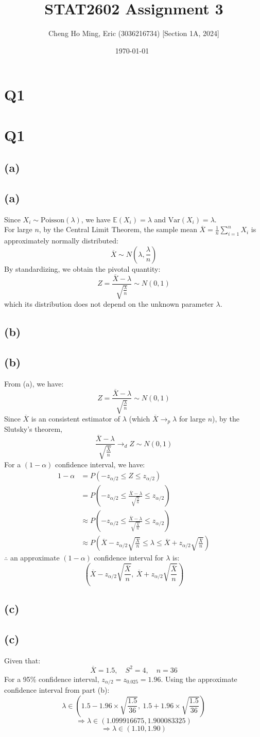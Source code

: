 \documentclass{article}
\title{STAT2602 Assignment 3}
\author{Cheng Ho Ming, Eric (3036216734) [Section 1A, 2024]}
\date{\today \ \currenttime}
\newcommand{\mysectionstar}[2][]{%
    \ifthenelse{\equal{#1}{}}%
        {\section*{#2}}%
        {\section*[#1]{#2}}%
    \outline{1}{#2}%
}
\newcommand{\mysubsectionstar}[2][]{%
    \ifthenelse{\equal{#1}{}}%
        {\subsection*{#2}}%
        {\subsection*[#1]{#2}}%
    \outline{2}{#2}%
}
\begin{document}
\maketitle

\mysectionstar{Q1}

\mysubsectionstar{(a)}

Since \( X_i \sim \text{Poisson}(\lambda) \), we have \( \mathbb{E}(X_i) = \lambda \) and \( \text{Var}(X_i) = \lambda \). \\
For large \( n \), by the Central Limit Theorem, the sample mean \( \overline{X} = \frac{1}{n}\sum_{i=1}^n X_i \) is approximately normally distributed:
\[
\overline{X} \sim N\left(\lambda, \frac{\lambda}{n}\right)
\]
By standardizing, we obtain the pivotal quantity:
\[
Z = \frac{\overline{X} - \lambda}{\sqrt{\frac{\lambda}{n}}} \sim N(0,1)
\]
which its distribution does not depend on the unknown parameter \( \lambda \).

\mysubsectionstar{(b)}

From (a), we have:
\[
Z = \frac{\overline{X} - \lambda}{\sqrt{\frac{\lambda}{n}}} \sim N(0,1)
\]
Since $\overline{X}$ is an consistent estimator of $\lambda$ (which $\overline{X} \rightarrow_p \lambda$ for large $n$), by the Slutsky's theorem,
\[
\frac{\overline{X} - \lambda}{\sqrt{\frac{\bar{X}}{n}}} \rightarrow_d Z \sim N(0,1)
\]
For a \( (1 - \alpha) \) confidence interval, we have:
\begin{align*}
1 - \alpha &= P\left(-z_{\alpha/2} \leq Z \leq z_{\alpha/2}\right) \\
&= P\left(-z_{\alpha/2} \leq \frac{\overline{X} - \lambda}{\sqrt{\frac{\lambda}{n}}} \leq z_{\alpha/2}\right) \\
&\approx P\left(-z_{\alpha/2} \leq \frac{\overline{X} - \lambda}{\sqrt{\frac{\bar{X}}{n}}} \leq z_{\alpha/2}\right) \\
&\approx P\left(\overline{X} - z_{\alpha/2}\sqrt{\frac{\bar{X}}{n}} \leq \lambda \leq \overline{X} + z_{\alpha/2}\sqrt{\frac{\bar{X}}{n}}\right)
\end{align*}
$\therefore$ an approximate \( (1 - \alpha) \) confidence interval for \( \lambda \) is:
\[
\left(\overline{X} - z_{\alpha/2}\sqrt{\frac{\overline{X}}{n}}, \ \overline{X} + z_{\alpha/2}\sqrt{\frac{\overline{X}}{n}}\right)
\]

\mysubsectionstar{(c)}

Given that:
\[
\overline{X} = 1.5, \quad S^2 = 4, \quad n = 36
\]
For a 95\% confidence interval, \( z_{\alpha/2} = z_{0.025} = 1.96 \). Using the approximate confidence interval from part (b):
\[
\lambda \in \left(1.5 - 1.96 \times \sqrt{\frac{1.5}{36}}, \ 1.5 + 1.96 \times \sqrt{\frac{1.5}{36}}\right)
\]
\[
\Rightarrow \lambda \in \left(1.099916675, 1.900083325\right)
\]
\[
\Rightarrow \lambda \in \left(1.10, 1.90\right)
\]
\end{document}

